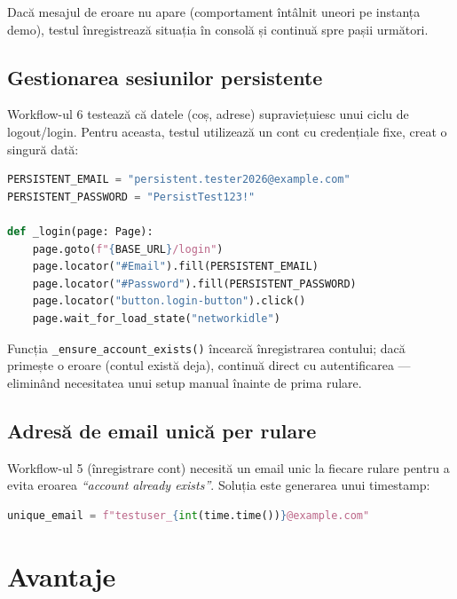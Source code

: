 Dacă mesajul de eroare nu apare (comportament întâlnit uneori pe instanța demo),
testul înregistrează situația în consolă și continuă spre pașii următori.

\subsection{Gestionarea sesiunilor persistente}

Workflow-ul 6 testează că datele (coș, adrese) supraviețuiesc unui ciclu de logout/login.
Pentru aceasta, testul utilizează un cont cu credențiale fixe, creat o singură dată:

\begin{lstlisting}[language=Python, caption={Funcție helper pentru autentificare}]
PERSISTENT_EMAIL = "persistent.tester2026@example.com"
PERSISTENT_PASSWORD = "PersistTest123!"

def _login(page: Page):
    page.goto(f"{BASE_URL}/login")
    page.locator("#Email").fill(PERSISTENT_EMAIL)
    page.locator("#Password").fill(PERSISTENT_PASSWORD)
    page.locator("button.login-button").click()
    page.wait_for_load_state("networkidle")
\end{lstlisting}

Funcția \texttt{\_ensure\_account\_exists()} încearcă înregistrarea contului; dacă
primește o eroare (contul există deja), continuă direct cu autentificarea ---
eliminând necesitatea unui setup manual înainte de prima rulare.

\subsection{Adresă de email unică per rulare}

Workflow-ul 5 (înregistrare cont) necesită un email unic la fiecare rulare pentru a evita
eroarea \textit{``account already exists''}. Soluția este generarea unui timestamp:

\begin{lstlisting}[language=Python, caption={Generare email unic cu timestamp}]
unique_email = f"testuser_{int(time.time())}@example.com"
\end{lstlisting}

\section{Avantaje}

